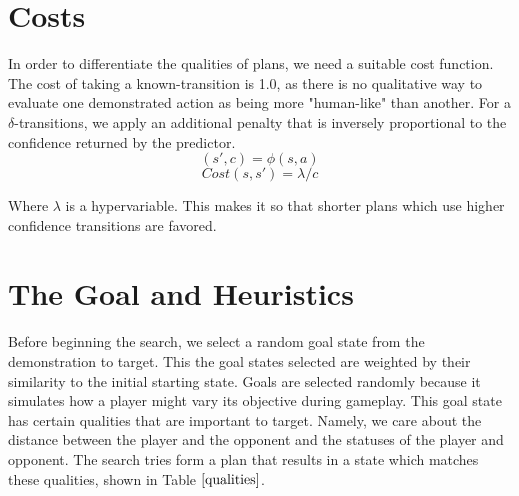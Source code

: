 



\section{Costs}

In order to differentiate the qualities of plans, we need a suitable cost function. The cost of taking a known-transition is 1.0, as there is no qualitative way to evaluate one demonstrated action as being more "human-like" than another. For a $\delta$-transitions, we apply an additional penalty that is inversely proportional to the confidence returned by the predictor.\\

$$(s',c) = \phi(s, a)$$
$$Cost(s, s') = \lambda/c$$

Where $\lambda$ is a hypervariable. This makes it so that shorter plans which use higher confidence transitions are favored. 

\section{The Goal and Heuristics}

Before beginning the search, we select a random goal state from the demonstration to target. This the goal states selected are weighted by their similarity to the initial starting state. Goals are selected randomly because it simulates how a player might vary its objective during gameplay. This goal state has certain qualities that are important to target. Namely, we care about the distance between the player and the opponent and the statuses of the player and opponent. The search tries form a plan that results in a state which matches these qualities, shown in Table $\ref{qualities}$. 

